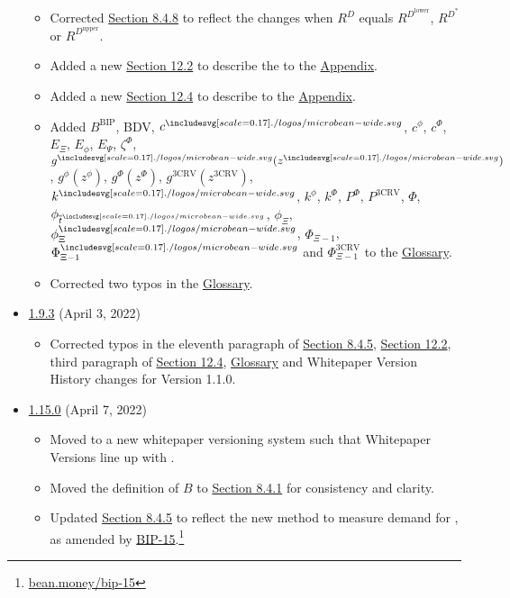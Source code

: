 \documentclass[class=article, crop=false]{standalone}
\begin{document}
\begin{itemize}[topsep=0pt, itemsep=3pt,leftmargin=16pt]
\begin{itemize}
        \item Corrected \hyperlink{subsubsection.8.4.8}{Section 8.4.8} to reflect the  changes when $R^D$ equals $R^{D^{\text{lower}}}$, $R^{D^*}$ or $R^{D^{\text{upper}}}$.
        \item Added a new \hyperlink{subsection.12.2}{Section 12.2} to describe the   to the \hyperlink{section.14}{Appendix}.
        \item Added a new \hyperlink{subsection.12.4}{Section 12.4} to describe  to the \hyperlink{section.14}{Appendix}.
        \item Added $B^{\text{BIP}}$, BDV, $c^{\bean}$, $c^{\phi}$, $c^{\Phi}$, $E_{\Xi}$, $E_{\phi}$, $E_{\Psi}$, $\zeta^{\Phi}$, $g^{\bean}(z^{\bean})$, $g^{\phi}(z^{\phi})$, $g^{\Phi}(z^{\Phi})$, $g^{\text{3CRV}}(z^{\text{3CRV}})$, $k^{\bean}$, $k^{\phi}$, $k^{\Phi}$, $P^{\Phi}$, $P^{\text{3CRV}}$, $\Phi$, $\phi_{\overline{t}^{\bean}}$, $\phi_{\Xi}$, $\phi_{\Xi}^{\bean}$, $\Phi_{\Xi-1}$, $\Phi_{\Xi-1}^{\bean}$ and $\Phi_{\Xi-1}^{\text{3CRV}}$ to the \hyperlink{subsection.14.11}{Glossary}. 
        \item Corrected two typos in the \hyperlink{subsection.14.11}{Glossary}.
    \end{itemize}
         \item \href{https://github.com/BeanstalkFarms/Beanstalk-Whitepaper/blob/master/version-history/beanstalk1_9_3.pdf}{1.9.3} (April 3, 2022)
    \begin{itemize}
        \item Corrected typos in the eleventh paragraph of \hyperlink{subsubsection.8.4.5}{Section 8.4.5}, \hyperlink{subsection.12.2}{Section 12.2}, third paragraph of \hyperlink{subsection.12.4}{Section 12.4}, \hyperlink{subsection.14.11}{Glossary} and Whitepaper Version History changes for Version 1.1.0.
    \end{itemize}   
        \item \href{https://github.com/BeanstalkFarms/Beanstalk-Whitepaper/blob/master/version-history/beanstalk1_15_0.pdf}{1.15.0} (April 7, 2022)
    \begin{itemize}
        \item Moved to a new whitepaper versioning system such that Whitepaper Versions line up with . 
        \item Moved the definition of $B$ to \hyperlink{subsubsection.8.4.1}{Section 8.4.1} for consistency and clarity. 
        \item Updated \hyperlink{subsubsection.8.4.5}{Section 8.4.5} to reflect the new method to measure demand for , as amended by \href{https://bean.money/bip-15}{BIP-15}.\footnote{\href{https://bean.money/bip-15}{bean.money/bip-15}}

\end{itemize}
\end{itemize}
\end{document}
